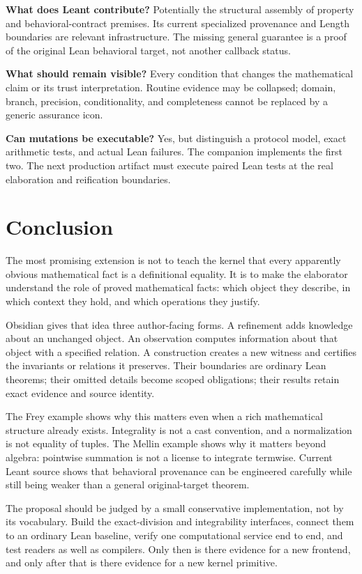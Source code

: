\documentclass[11pt,a4paper]{article}
\theoremstyle{plain}\newtheorem{proposition}{Proposition}[section]
\theoremstyle{definition}\newtheorem{definition}[proposition]{Definition}
\theoremstyle{remark}\newtheorem{remark}[proposition]{Remark}
\begin{document}
\textbf{What does Leant contribute?} Potentially the structural assembly of property and behavioral-contract premises. Its current specialized provenance and Length boundaries are relevant infrastructure. The missing general guarantee is a proof of the original Lean behavioral target, not another callback status.

\textbf{What should remain visible?} Every condition that changes the mathematical claim or its trust interpretation. Routine evidence may be collapsed; domain, branch, precision, conditionality, and completeness cannot be replaced by a generic assurance icon.

\textbf{Can mutations be executable?} Yes, but distinguish a protocol model, exact arithmetic tests, and actual Lean failures. The companion implements the first two. The next production artifact must execute paired Lean tests at the real elaboration and reification boundaries.

\section{Conclusion}
The most promising extension is not to teach the kernel that every apparently obvious mathematical fact is a definitional equality. It is to make the elaborator understand the role of proved mathematical facts: which object they describe, in which context they hold, and which operations they justify.

Obsidian gives that idea three author-facing forms. A refinement adds knowledge about an unchanged object. An observation computes information about that object with a specified relation. A construction creates a new witness and certifies the invariants or relations it preserves. Their boundaries are ordinary Lean theorems; their omitted details become scoped obligations; their results retain exact evidence and source identity.

The Frey example shows why this matters even when a rich mathematical structure already exists. Integrality is not a cast convention, and a normalization is not equality of tuples. The Mellin example shows why it matters beyond algebra: pointwise summation is not a license to integrate termwise. Current Leant source shows that behavioral provenance can be engineered carefully while still being weaker than a general original-target theorem.

The proposal should be judged by a small conservative implementation, not by its vocabulary. Build the exact-division and integrability interfaces, connect them to an ordinary Lean baseline, verify one computational service end to end, and test readers as well as compilers. Only then is there evidence for a new frontend, and only after that is there evidence for a new kernel primitive.
\end{document}
